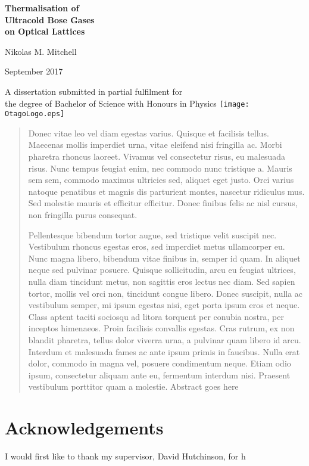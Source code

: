 \documentclass[11pt,final,twoside]{report}
\date{September 2017}
\begin{document}
\begin{titlepage}

\begin{center}
{\Huge \textbf{Thermalisation of}}\\[5mm]
{\Huge \textbf{Ultracold Bose Gases}}\\[5mm]
{\Huge \textbf{on Optical Lattices}}
\vspace*{3cm}

\Huge{Nikolas M. Mitchell}
\vspace*{35mm}

\Large{September 2017}
\vspace*{15mm}

\large{A dissertation submitted in partial fulfilment for  \\
the degree of Bachelor of Science with Honours in Physics}
\vfill
\texttt{[image: OtagoLogo.eps]}



\end{center}

\end{titlepage}

\begin{abstract}
Donec vitae leo vel diam egestas varius. Quisque et facilisis tellus. Maecenas mollis imperdiet urna, vitae eleifend nisi fringilla ac. Morbi pharetra rhoncus laoreet. Vivamus vel consectetur risus, eu malesuada risus. Nunc tempus feugiat enim, nec commodo nunc tristique a. Mauris sem sem, commodo maximus ultricies sed, aliquet eget justo. Orci varius natoque penatibus et magnis dis parturient montes, nascetur ridiculus mus. Sed molestie mauris et efficitur efficitur. Donec finibus felis ac nisl cursus, non fringilla purus consequat.

Pellentesque bibendum tortor augue, sed tristique velit suscipit nec. Vestibulum rhoncus egestas eros, sed imperdiet metus ullamcorper eu. Nunc magna libero, bibendum vitae finibus in, semper id quam. In aliquet neque sed pulvinar posuere. Quisque sollicitudin, arcu eu feugiat ultrices, nulla diam tincidunt metus, non sagittis eros lectus nec diam. Sed sapien tortor, mollis vel orci non, tincidunt congue libero. Donec suscipit, nulla ac vestibulum semper, mi ipsum egestas nisi, eget porta ipsum eros et neque. Class aptent taciti sociosqu ad litora torquent per conubia nostra, per inceptos himenaeos. Proin facilisis convallis egestas. Cras rutrum, ex non blandit pharetra, tellus dolor viverra urna, a pulvinar quam libero id arcu. Interdum et malesuada fames ac ante ipsum primis in faucibus. Nulla erat dolor, commodo in magna vel, posuere condimentum neque. Etiam odio ipsum, consectetur aliquam ante eu, fermentum interdum nisi. Praesent vestibulum porttitor quam a molestie.
Abstract goes here
\end{abstract}

\chapter*{Acknowledgements}
\thispagestyle{plain}
I would first like to thank my supervisor, David Hutchinson, for h

\tableofcontents


\end{document}
